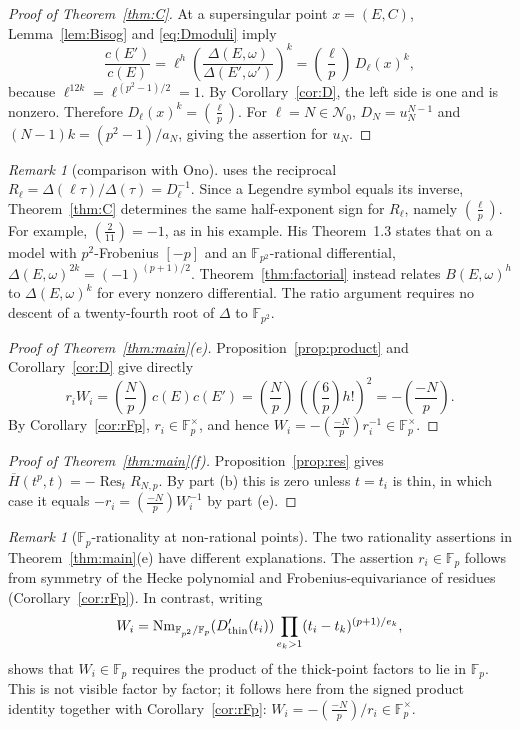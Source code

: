 \documentclass[11pt,a4paper]{article}
\numberwithin{equation}{section}
\theoremstyle{definition}
\theoremstyle{remark}
\newtheorem{remark}[theorem]{Remark}
\newcommand{\Fp}{\mathbb F_p}
\newcommand{\Fq}{\mathbb F_{p^2}}
\newcommand{\Res}{\operatorname{Res}}
\newcommand{\leg}[2]{\left(\frac{#1}{#2}\right)}
\newcommand{\Lp}[1]{\left(\frac{#1}{p}\right)}
\begin{document}
\begin{proof}[Proof of Theorem~\ref{thm:C}]
At a supersingular point $x=(E,C)$, Lemma~\ref{lem:Bisog} and
\eqref{eq:Dmoduli} imply
\[
\frac{c(E')}{c(E)}
=\ell^h\left(\frac{\Delta(E,\omega)}{\Delta(E',\omega')}\right)^k
=\Lp\ell\,D_\ell(x)^k,
\]
because $\ell^{12k}=\ell^{(p^2-1)/2}=1$.
By Corollary~\ref{cor:D}, the left side is one and is nonzero.
Therefore $D_\ell(x)^k=\Lp\ell$. For $\ell=N\in\mathcal N_0$,
$D_N=u_N^{N-1}$ and $(N-1)k=(p^2-1)/a_N$, giving the assertion for $u_N$.
\end{proof}

\begin{remark}[comparison with Ono]\label{rem:ono}
\citet[Theorem~1.2 and Remark~4]{Ono25} uses the reciprocal
$R_\ell=\Delta(\ell\tau)/\Delta(\tau)=D_\ell^{-1}$.
Since a Legendre symbol equals its inverse, Theorem~\ref{thm:C}
determines the same half-exponent sign for $R_\ell$, namely $\Lp\ell$.
For example, $\leg2{11}=-1$, as in his example.
His Theorem~1.3 states that on a model with $p^2$-Frobenius $[-p]$
and an $\Fq$-rational differential,
$\Delta(E,\omega)^{2k}=(-1)^{(p+1)/2}$.
Theorem~\ref{thm:factorial} instead relates $B(E,\omega)^h$ to
$\Delta(E,\omega)^k$ for every nonzero differential.
The ratio argument requires no descent of a twenty-fourth root of
$\Delta$ to $\Fq$.
\end{remark}

\begin{proof}[Proof of Theorem~\ref{thm:main}(e)]
Proposition~\ref{prop:product} and Corollary~\ref{cor:D} give directly
\[
r_iW_i=\Lp N\,c(E)c(E')
=\Lp N\,(\Lp6h!)^2=-\Lp{-N}.
\]
By Corollary~\ref{cor:rFp}, $r_i\in\Fp^\times$, and hence
$W_i=-\Lp{-N}r_i^{-1}\in\Fp^\times$.
\end{proof}

\begin{proof}[Proof of Theorem~\ref{thm:main}(f)]
Proposition~\ref{prop:res} gives
$\overline H(t^p,t)=-\Res_tR_{N,p}$. By part (b) this is zero
unless $t=t_i$ is thin, in which case it equals
$-r_i=\Lp{-N}W_i^{-1}$ by part (e).
\end{proof}

\begin{remark}[$\Fp$-rationality at non-rational points]
The two rationality assertions in Theorem~\ref{thm:main}(e) have different
explanations. The assertion $r_i\in\Fp$ follows from symmetry of the
Hecke polynomial and Frobenius-equivariance of residues
(Corollary~\ref{cor:rFp}). In contrast, writing
\[
W_i=\operatorname{Nm}_{\Fq/\Fp}(D_{\rm thin}'(t_i))
\prod_{e_k>1}(t_i-t_k)^{(p+1)/e_k},
\]
shows that $W_i\in\Fp$ requires the product of the thick-point factors
to lie in $\Fp$. This is not visible factor by factor; it follows here
from the signed product identity together with Corollary~\ref{cor:rFp}:
$W_i=-\Lp{-N}/r_i\in\Fp^\times$.
\end{remark}
\end{document}

